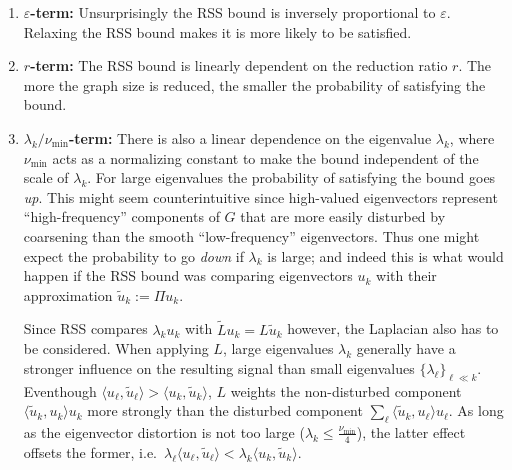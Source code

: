 \begin{enumerate}[label=\textbf{\arabic*.}]
	\item \textbf{$\varepsilon$-term:}
		Unsurprisingly the RSS bound is inversely proportional to $\varepsilon$.
		Relaxing the RSS bound makes it is more likely to be satisfied.
	\item \textbf{$r$-term:}
		The RSS bound is linearly dependent on the reduction ratio $r$.
		The more the graph size is reduced, the smaller the probability of satisfying the bound.
	\item \textbf{$\lambda_k / \nu_{\text{min}}$-term:}
		There is also a linear dependence on the eigenvalue $\lambda_k$, where $\nu_{\text{min}}$ acts as a normalizing constant to make the bound independent of the scale of $\lambda_k$.
		For large eigenvalues the probability of satisfying the bound goes \textit{up}.
		This might seem counterintuitive since high-valued eigenvectors represent ``high-frequency'' components of $G$ that are more easily disturbed by coarsening than the smooth ``low-frequency'' eigenvectors.
		Thus one might expect the probability to go \textit{down} if $\lambda_k$ is large;
		and indeed this is what would happen if the RSS bound was comparing eigenvectors $u_k$ with their approximation $\widetilde{u}_k := \Pi u_k$.

		Since RSS compares $\lambda_k u_k$ with $\widetilde{L} u_k = L \widetilde{u}_k$ however, the Laplacian also has to be considered.
		When applying $L$, large eigenvalues $\lambda_k$ generally have a stronger influence on the resulting signal than small eigenvalues ${\{ \lambda_\ell \}}_{\ell \ll k}$.
		Eventhough $\langle u_\ell, \widetilde{u}_\ell \rangle > \langle u_k, \widetilde{u}_k \rangle$, $L$ weights the non-disturbed component $\langle \widetilde{u}_k, u_k \rangle u_k$ more strongly than the disturbed component $\sum_\ell \langle \widetilde{u}_k, u_\ell \rangle u_\ell$.
		As long as the eigenvector distortion is not too large ($\lambda_k \leq \frac{\nu_\text{min}}{4}$), the latter effect offsets the former, i.e.\ $\lambda_\ell \langle u_\ell, \widetilde{u}_\ell \rangle < \lambda_k \langle u_k, \widetilde{u}_k \rangle$.


\end{enumerate}

